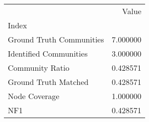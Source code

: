 \begin{tabular}{lr}
\toprule
{} &     Value \\
Index                    &           \\
\midrule
Ground Truth Communities &  7.000000 \\
Identified Communities   &  3.000000 \\
Community Ratio          &  0.428571 \\
Ground Truth Matched     &  0.428571 \\
Node Coverage            &  1.000000 \\
NF1                      &  0.428571 \\
\bottomrule
\end{tabular}
